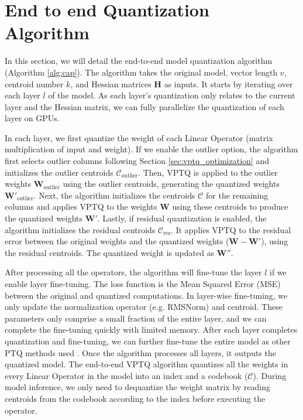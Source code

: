 \section{End to end Quantization Algorithm}\label{sec:e2e}
\vspace{-0.05in}


In this section, we will detail the end-to-end model quantization algorithm (Algorithm \ref{alg:cap}). 
The algorithm takes the original model, vector length \(v\), centroid number \(k\), and Hessian matrices \(\mathbf{H}\) as inputs. 
It starts by iterating over each layer \(l\) of the model. As each layer's quantization only relates to the current layer and the Hessian matrix, we can fully parallelize the quantization of each layer on GPUs.

In each layer, we first quantize the weight of each Linear Operator (matrix multiplication of input and weight). If we enable the outlier option, the algorithm first selects outlier columns following Section \ref{sec:vptq_optimization} and initializes the outlier centroids \(\mathcal{C}_{\text{outlier}}\). 
Then, VPTQ is applied to the outlier weights \(\mathbf{W}_{\text{outlier}}\) using the outlier centroids, generating the quantized weights \(\mathbf{W}'_{\text{outlier}}\). 
Next, the algorithm initializes the centroids \(\mathcal{C}\) for the remaining columns and applies VPTQ to the weights \(\mathbf{W}\) using these centroids to produce the quantized weights \(\mathbf{W}'\). 
Lastly, if residual quantization is enabled, the algorithm initializes the residual centroids \(\mathcal{C}_{\text{res}}\). 
It applies VPTQ to the residual error between the original weights and the quantized weights (\(\mathbf{W} - \mathbf{W}'\)), using the residual centroids.
The quantized weight is updated as \(\mathbf{W}''\).

After processing all the operators, the algorithm will fine-tune the layer \(l\) if we enable layer fine-tuning. 
The loss function is the Mean Squared Error (MSE) between the original and quantized computations. 
In layer-wise fine-tuning, we only update the normalization operator (e.g. RMSNorm) and centroid. 
These parameters only comprise a small fraction of the entire layer, and we can complete the fine-tuning quickly with limited memory. After each layer completes quantization and fine-tuning, we can further fine-tune the entire model as other PTQ methods used \citep{QuIPsharp, QuIP, AQLM}.
Once the algorithm processes all layers, it outputs the quantized model. 
The end-to-end VPTQ algorithm quantizes all the weights in every Linear Operator in the model into an index and a codebook (\(\mathcal{C}\)). 
During model inference, we only need to dequantize the weight matrix by reading centroids from the codebook according to the index before executing the operator.







